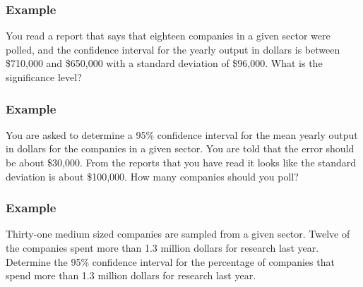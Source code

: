 \begin{frame}
  \frametitle{Example}

  You read a report that says that eighteen companies in a given
  sector were polled, and the confidence interval for the yearly
  output in dollars is between \$710,000 and \$650,000 with a standard
  deviation of \$96,000. What is the significance level?

  \vfill


  \vfill

\end{frame}


\begin{frame}
  \frametitle{Example}

  You are asked to determine a 95\% confidence interval for the mean
  yearly output in dollars for the companies in a given sector. You
  are told that the error should be about \$30,000. From the reports
  that you have read it looks like the standard deviation is about
  \$100,000. How many companies should you poll?

  \vfill


  \vfill


\end{frame}


\begin{frame}
  \frametitle{Example}

  Thirty-one medium sized companies are sampled from a given
  sector. Twelve of the companies spent more than 1.3 million dollars
  for research last year. Determine the 95\% confidence interval for
  the percentage of companies that spend more than 1.3 million dollars
  for research last year.

  \vfill


  \vfill


\end{frame}



